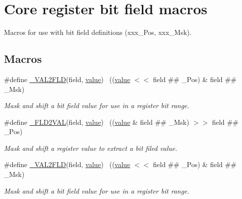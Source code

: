 \hypertarget{group___c_m_s_i_s__core__bitfield}{}\section{Core register bit field macros}
\label{group___c_m_s_i_s__core__bitfield}


Macros for use with bit field definitions (xxx\+\_\+\+Pos, xxx\+\_\+\+Msk).  


\subsection*{Macros}
\begin{DoxyCompactItemize}
\item 
\#define \hyperlink{group___c_m_s_i_s__core__bitfield_ga6d42abc96f2b99932a82deb035bd6935}{\+\_\+\+V\+A\+L2\+F\+LD}(field,  \hyperlink{semihosting_8h_aacce635d68067370c70caa2381ea1040}{value})    ~((\hyperlink{semihosting_8h_aacce635d68067370c70caa2381ea1040}{value} $<$$<$ field \#\# \+\_\+\+Pos) \& field \#\# \+\_\+\+Msk)
\begin{DoxyCompactList}\small\item\em Mask and shift a bit field value for use in a register bit range. \end{DoxyCompactList}\item 
\#define \hyperlink{group___c_m_s_i_s__core__bitfield_ga7c1d2cae011acffd9401d0096f938cd7}{\+\_\+\+F\+L\+D2\+V\+AL}(field,  \hyperlink{semihosting_8h_aacce635d68067370c70caa2381ea1040}{value})    ~((\hyperlink{semihosting_8h_aacce635d68067370c70caa2381ea1040}{value} \& field \#\# \+\_\+\+Msk) $>$$>$ field \#\# \+\_\+\+Pos)
\begin{DoxyCompactList}\small\item\em Mask and shift a register value to extract a bit filed value. \end{DoxyCompactList}\item 
\#define \hyperlink{group___c_m_s_i_s__core__bitfield_ga6d42abc96f2b99932a82deb035bd6935}{\+\_\+\+V\+A\+L2\+F\+LD}(field,  \hyperlink{semihosting_8h_aacce635d68067370c70caa2381ea1040}{value})    ~((\hyperlink{semihosting_8h_aacce635d68067370c70caa2381ea1040}{value} $<$$<$ field \#\# \+\_\+\+Pos) \& field \#\# \+\_\+\+Msk)
\begin{DoxyCompactList}\small\item\em Mask and shift a bit field value for use in a register bit range. \end{DoxyCompactList}\item 
$$
\end{DoxyCompactItemize}
